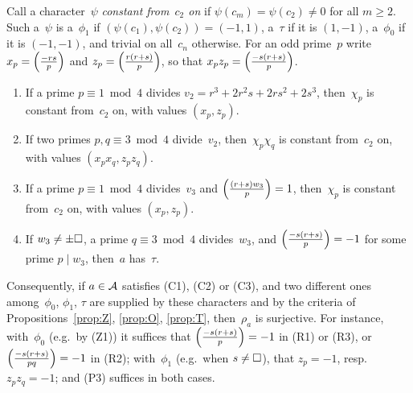 \begin{corollary}
  \label{cor:further}
  \leanok
  Call a character~$\psi$ \emph{constant from~$c_2$ on} if $\psi(c_m) = \psi(c_2) \ne 0$ for all
  $m \ge 2$. Such a~$\psi$ is a~$\phi_1$ if $(\psi(c_1), \psi(c_2)) = (-1, 1)$, a~$\tau$ if it is
  $(1, -1)$, a~$\phi_0$ if it is $(-1, -1)$, and trivial on all~$c_n$ otherwise. For an odd
  prime~$p$ write $x_p = \left(\frac{-rs}{p}\right)$ and $z_p = \left(\frac{r(r+s)}{p}\right)$, so that
  $x_p z_p = \left(\frac{-s(r+s)}{p}\right)$.
  \begin{enumerate}
    \item[(R1)] If a prime $p \equiv 1 \bmod 4$ divides $v_2 = r^3 + 2r^2 s + 2rs^2 + 2s^3$,
          then~$\chi_p$ is constant from~$c_2$ on, with values $(x_p, z_p)$.
    \item[(R2)] If two primes $p, q \equiv 3 \bmod 4$ divide~$v_2$, then~$\chi_p \chi_q$ is
          constant from~$c_2$ on, with values $(x_p x_q, z_p z_q)$.
    \item[(R3)] If a prime $p \equiv 1 \bmod 4$ divides~$v_3$ and $\left(\frac{(r + s) w_3}{p}\right) = 1$,
          then~$\chi_p$ is constant from~$c_2$ on, with values $(x_p, z_p)$.
    \item[(P3)] If $w_3 \ne \pm\square$, a prime $q \equiv 3 \bmod 4$ divides~$w_3$, and
          $\left(\frac{-s(r+s)}{p}\right) = -1$ for some prime $p \mid w_3$, then~$a$ has~$\tau$.
  \end{enumerate}
  Consequently, if $a \in \mathcal{A}$ satisfies (C1), (C2) or (C3), and two different ones
  among~$\phi_0$, $\phi_1$, $\tau$ are supplied by these characters and by the criteria of
  Propositions~\ref{prop:Z}, \ref{prop:O}, \ref{prop:T}, then~$\rho_a$ is surjective. For
  instance, with~$\phi_0$ (e.g.\ by (Z1)) it suffices that $\left(\frac{-s(r+s)}{p}\right) = -1$ in (R1) or
  (R3), or $\left(\frac{-s(r+s)}{pq}\right) = -1$ in (R2); with~$\phi_1$ (e.g.\ when $s \ne \square$), that
  $z_p = -1$, resp.\ $z_p z_q = -1$; and (P3) suffices in both cases.
\end{corollary}
